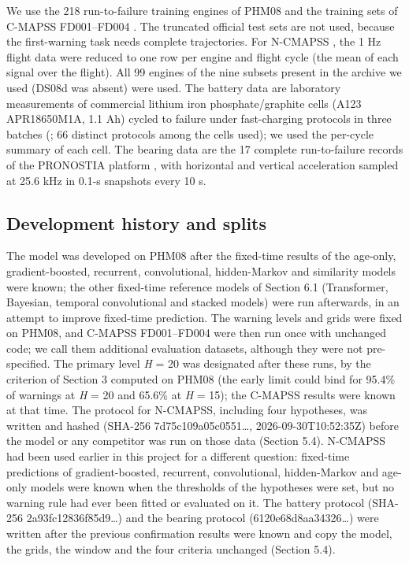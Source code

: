 \documentclass[a4paper,fleqn,doubleblind]{cas-dc}
\begin{document}
We use the 218 run-to-failure training engines of PHM08 and the training sets of C-MAPSS FD001--FD004 \cite{saxena2008}. The truncated official test sets are not used, because the first-warning task needs complete trajectories. For N-CMAPSS \cite{ariaschao2021}, the 1 Hz flight data were reduced to one row per engine and flight cycle (the mean of each signal over the flight). All 99 engines of the nine subsets present in the archive we used (DS08d was absent) were used. The battery data are laboratory measurements of commercial lithium iron phosphate/graphite cells (A123 APR18650M1A, 1.1 Ah) cycled to failure under fast-charging protocols in three batches (\cite{severson2019}; 66 distinct protocols among the cells used); we used the per-cycle summary of each cell. The bearing data are the 17 complete run-to-failure records of the PRONOSTIA platform \cite{nectoux2012}, with horizontal and vertical acceleration sampled at 25.6 kHz in 0.1-s snapshots every 10 s.

\subsection{Development history and splits}

The model was developed on PHM08 after the fixed-time results of the age-only, gradient-boosted, recurrent, convolutional, hidden-Markov and similarity models were known; the other fixed-time reference models of Section 6.1 (Transformer, Bayesian, temporal convolutional and stacked models) were run afterwards, in an attempt to improve fixed-time prediction. The warning levels and grids were fixed on PHM08, and C-MAPSS FD001--FD004 were then run once with unchanged code; we call them additional evaluation datasets, although they were not pre-specified. The primary level \textit{H} = 20 was designated after these runs, by the criterion of Section 3 computed on PHM08 (the early limit could bind for 95.4\% of warnings at \textit{H} = 20 and 65.6\% at \textit{H} = 15); the C-MAPSS results were known at that time. The protocol for N-CMAPSS, including four hypotheses, was written and hashed (SHA-256 7d75c109a05c0551\ldots{}, 2026-09-30T10:52:35Z) before the model or any competitor was run on those data (Section 5.4). N-CMAPSS had been used earlier in this project for a different question: fixed-time predictions of gradient-boosted, recurrent, convolutional, hidden-Markov and age-only models were known when the thresholds of the hypotheses were set, but no warning rule had ever been fitted or evaluated on it. The battery protocol (SHA-256 2a93fc12836f85d9\ldots{}) and the bearing protocol (6120e68d8aa34326\ldots{}) were written after the previous confirmation results were known and copy the model, the grids, the window and the four criteria unchanged (Section 5.4).
\end{document}
